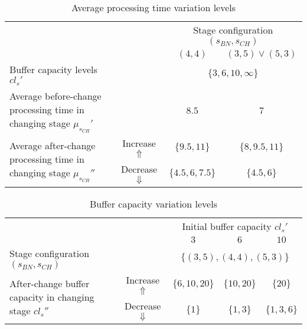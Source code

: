 \begin{landscape}
\begin{table}[p]
	\caption{Average processing time variation levels}
	\centering
	\label{table: Average processing time variation levels}
	\begin{tabular}{l c c c}
		\toprule
		\multirow{2}{*}{} & & \multicolumn{2}{c}{Stage configuration $(s_{BN},s_{CH})$}\\ 
		\cmidrule{3-4}
		& & $(4,4)$ & $(3,5)\vee(5,3)$\\ 
		\midrule
		Buffer capacity levels $cl_s'$ & & \multicolumn{2}{c}{$\{3,6,10,\infty\}$}\\
		Average before-change processing time in changing stage $\mu_{s_{CH}}'$ & & $8.5$ & $7$\\
		\midrule \midrule
		\multirow{2}{*}{Average after-change processing time in changing stage $\mu_{s_{CH}}''$} & 
		Increase $\Uparrow$ & $\{9.5,11\}$ & $\{8,9.5,11\}$\\
		& Decrease $\Downarrow$ & $\{4.5,6,7.5\}$ & $\{4.5,6\}$\\
		\bottomrule
	\end{tabular}
\end{table}
\begin{table}[p]
	\caption{Buffer capacity variation levels}
	\centering
	\label{table: Buffer capacity variation levels}
	\begin{tabular}{l c c c c}
		\toprule
		\multirow{2}{*}{} & & \multicolumn{3}{c}{Initial buffer capacity $cl_s'$}\\ 
		\cmidrule{3-5}
		& & $3$ & $6$ & $10$\\ 
		\midrule
		Stage configuration $(s_{BN},s_{CH})$ & & \multicolumn{3}{c}{$\{(3,5),(4,4),(5,3)\}$}\\
		\midrule \midrule
		\multirow{2}{*}{After-change buffer capacity in changing stage $cl_s''$} & 
		Increase $\Uparrow$ & $\{6,10,20\}$ & $\{10,20\}$ & $\{20\}$\\
		& Decrease $\Downarrow$ & $\{1\}$ & $\{1,3\}$ & $\{1,3,6\}$\\
		\bottomrule
	\end{tabular}
\end{table}
\end{landscape}

